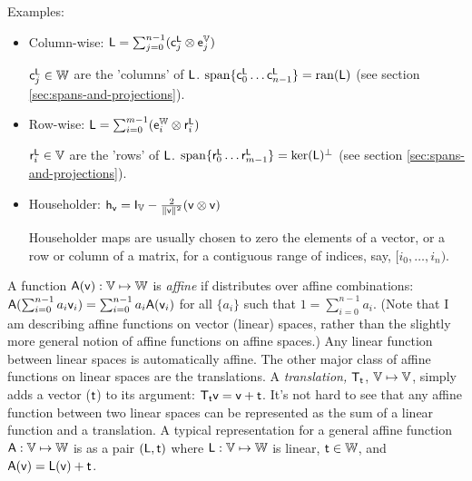 Examples:

\begin{itemize}

\item Column-wise:
$\mathsf{L} = \sum_{j=0}^{n-1} ( \mathsf{c}_j^{\mathsf{L}} \otimes \mathsf{e}_j^{\mathbb{V}} )$

$\mathsf{c}_j^{\mathsf{L}} \in \mathbb{W}$ are the 'columns' of $\mathsf{L}$.
$\mathrm{span}\{ \mathsf{c}_0^{\mathsf{L}} \ldots \mathsf{c}_{n-1}^{\mathsf{L}} \} = \mathrm{ran}(\mathsf{L})$
(see section \ref{sec:spans-and-projections}).

\item Row-wise:
$\mathsf{L} = \sum_{i=0}^{m-1} ( \mathsf{e}_i^{\mathbb{W}} \otimes  \mathsf{r}_i^{\mathsf{L}} )$

$\mathsf{r}_i^{\mathsf{L}} \in \mathbb{V}$ are the 'rows' of $\mathsf{L}$.
$\mathrm{span}\{ \mathsf{r}_0^{\mathsf{L}} \ldots \mathsf{r}_{m-1}^{\mathsf{L}} \} =  \mathrm{ker}(\mathsf{L})^{\perp}$
(see section \ref{sec:spans-and-projections}).

\item Householder:
$\mathsf{h}_{\mathsf{v}} = \mathsf{I}_{\mathbb{V}} - \frac{2}{\| \mathsf{v} \|^2} (\mathsf{v} \otimes \mathsf{v})$

Householder maps are usually chosen to zero the elements of
a vector, or a row or column of a matrix, for a contiguous range of
indices, say, $[i_0,\ldots,i_n)$.

\end {itemize}

\label{sec:affine-functions}

A function $\mathsf{A}(\mathsf{v}):\mathbb{V} \mapsto \mathbb{W}$
is \textit{affine} if distributes over affine combinations:
$\mathsf{A}(\sum_{i=0}^{n-1} a_i \mathsf{v}_i) = \sum_{i=0}^{n-1} a_i \mathsf{A}(\mathsf{v}_i) $
for all $\{a_i\}$ such that $1 = \sum_{i=0}^{n-1} a_i$.
(Note that I am describing affine functions on vector (linear) spaces,
rather than the slightly more general notion of affine functions on affine spaces.)
Any linear function between linear spaces is automatically affine.
The other major class of affine functions on linear spaces are the translations.
A \textit{translation,} $\mathsf{T}_{\mathsf{t}}$, $\mathbb{V} \mapsto \mathbb{V}$,
simply adds a vector ($\mathsf{t}$) to its argument:
$\mathsf{T}_{\mathsf{t}} \mathsf{v} = \mathsf{v} + \mathsf{t}$.
It's not hard to see that any affine function between two linear spaces
can be represented as the sum of a linear function and a translation.
A typical representation for a general affine function $\mathsf{A} : \mathbb{V} \mapsto \mathbb{W}$
is as a pair $(\mathsf{L},\mathsf{t})$ where $\mathsf{L} : \mathbb{V} \mapsto \mathbb{W}$ is linear,
$\mathsf{t} \in \mathbb{W}$, and $\mathsf{A}(\mathsf{v}) = \mathsf{L}(\mathsf{v}) + \mathsf{t}$.

